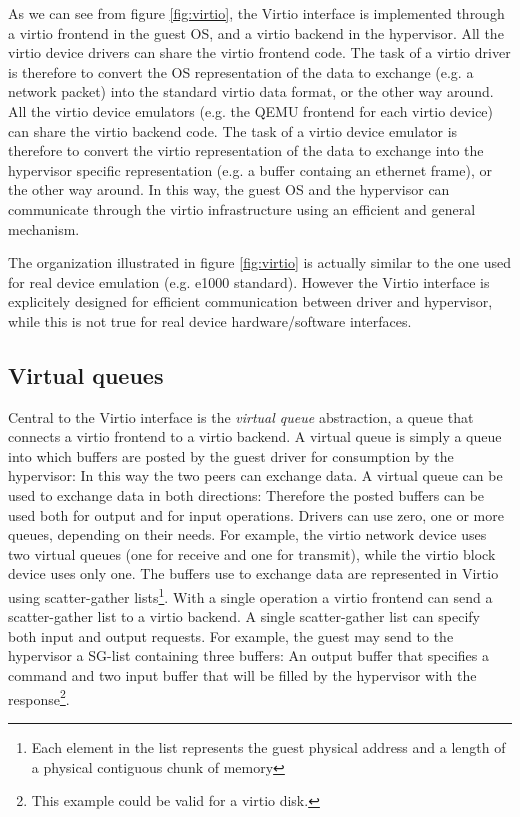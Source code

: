 As we can see from figure \ref{fig:virtio}, the Virtio interface is implemented through a virtio frontend in the guest OS, and a virtio
backend in the hypervisor. All the virtio device drivers can share the virtio frontend code. The task of a virtio driver is therefore to
convert the OS representation of the data to exchange (e.g. a network packet) into the standard virtio data format, or the other way
around. All the virtio device emulators (e.g. the QEMU frontend for each virtio device) can share the virtio backend code. The task
of a virtio device emulator is therefore to convert the virtio representation of the data to exchange into the hypervisor specific
representation (e.g. a buffer containg an ethernet frame), or the other way around. In this way, the guest OS and the hypervisor can
communicate through the virtio infrastructure using an efficient and general mechanism.

\vspace{0.5cm}

The organization illustrated in figure \ref{fig:virtio} is actually similar to the one used for real device emulation (e.g. e1000 standard).
However the Virtio interface is explicitely designed for efficient communication between driver and hypervisor, while this is not true for
real device hardware/software interfaces.


\subsection{Virtual queues}
\label{sec:virtqueue}
Central to the Virtio interface is the \emph{virtual queue} abstraction, a queue that connects a virtio frontend to a virtio backend.
A virtual queue is simply a queue into which buffers are posted by the guest driver for consumption by the hypervisor: In this way
the two peers can exchange data.
A virtual queue can be used to exchange data in both directions: Therefore the posted buffers can be used both for output and for input 
operations. Drivers can use zero, one or more queues, depending on their needs. For example, the virtio network device uses two virtual
queues (one for receive and one for transmit), while the virtio block device uses only one.
The buffers use to exchange data are represented in Virtio using scatter-gather lists\footnote{Each
element in the list represents the guest physical address and a length of a physical contiguous chunk of memory}. With a single operation
a virtio frontend can send a scatter-gather list to a virtio backend. A single scatter-gather list can specify both input and output 
requests. For example, the guest may send to the hypervisor a SG-list containing three buffers: An output buffer that specifies a 
command and two input buffer that will be filled by the hypervisor with the response\footnote{This example could be valid for a virtio
disk.}.

